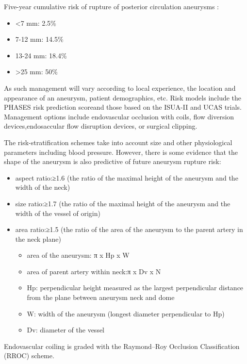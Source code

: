 Five-year cumulative risk of rupture of posterior circulation aneurysms :

\begin{itemize}
	\item
	\textless7 mm: 2.5\%
	\item
	7-12 mm: 14.5\%
	\item
	13-24 mm: 18.4\%
	\item
	\textgreater25 mm: 50\%
\end{itemize}

As such management will vary according to local experience, the location and appearance of an aneurysm, patient demographics, etc. Risk models include the PHASES risk prediction scoreand those based on the ISUA-II and UCAS trials. Management options include endovascular occlusion with coils, flow diversion devices,endosaccular flow disruption devices, or surgical clipping.

The risk-stratification schemes take into account size and other physiological parameters including blood pressure. However, there is some evidence  that the shape of the aneurysm is also predictive of future aneurysm rupture risk:

\begin{itemize}
	\item
	aspect ratio:≥1.6 (the ratio of the maximal height of the aneurysm and the width of the neck)
	\item
	size ratio:≥1.7 (the ratio of the maximal height of the aneurysm and the width of the vessel of origin)
	\item
	area ratio:≥1.5 (the ratio of the area of the aneurysm to the parent artery in the neck plane)
	
	\begin{itemize}
		\item
		area of the aneurysm: π x Hp x W
		\item
		area of parent artery within neck:π x Dv x N
		\item
		Hp: perpendicular height measured as the largest perpendicular distance from the plane between aneurysm neck and dome
		\item
		W: width of the aneurysm (longest diameter perpendicular to Hp)
		\item
		Dv: diameter of the vessel
	\end{itemize}
\end{itemize}

Endovascular coiling is graded with the Raymond--Roy Occlusion Classification (RROC) \textbf{} scheme.

